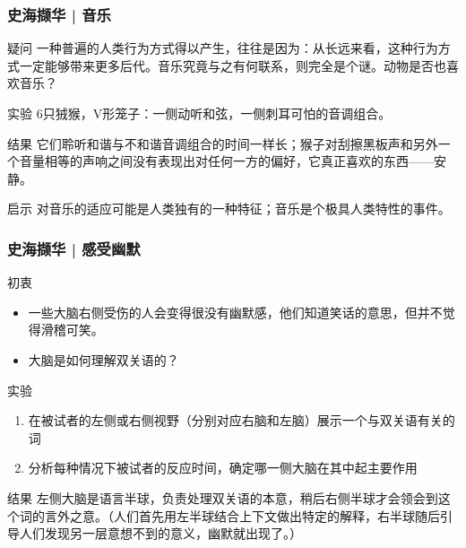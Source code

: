 \begin{frame}
  \frametitle{史海撷华 | 音乐}
  \begin{block}{疑问}
      一种普遍的人类行为方式得以产生，往往是因为：从长远来看，这种行为方式一定能够带来更多后代。音乐究竟与之有何联系，则完全是个谜。动物是否也喜欢音乐？
  \end{block}
  \vspace{-0.5em}
  \pause
  \begin{block}{实验}
    6只狨猴，V形笼子：一侧动听和弦，一侧刺耳可怕的音调组合。
  \end{block}
  \vspace{-0.5em}
  \pause
  \begin{block}{结果}
    它们聆听和谐与不和谐音调组合的时间一样长；猴子对刮擦黑板声和另外一个音量相等的声响之间没有表现出对任何一方的偏好，它真正喜欢的东西——安静。
  \end{block}
  \vspace{-0.5em}
  \pause
  \begin{block}{启示}
    对音乐的适应可能是人类独有的一种特征；音乐是个极具人类特性的事件。
  \end{block}
\end{frame}

\begin{frame}
  \frametitle{史海撷华 | 感受幽默}
  \begin{block}{初衷}
    \begin{itemize}
      \item 一些大脑右侧受伤的人会变得很没有幽默感，他们知道笑话的意思，但并不觉得滑稽可笑。
      \item 大脑是如何理解双关语的？
    \end{itemize}
  \end{block}
  \vspace{-0.5em}
  \pause
  \begin{block}{实验}
    \begin{enumerate}
      \item 在被试者的左侧或右侧视野（分别对应右脑和左脑）展示一个与双关语有关的词
      \item 分析每种情况下被试者的反应时间，确定哪一侧大脑在其中起主要作用
    \end{enumerate}
  \end{block}
  \vspace{-0.5em}
  \pause
  \begin{block}{结果}
    左侧大脑是语言半球，负责处理双关语的本意，稍后右侧半球才会领会到这个词的言外之意。（人们首先用左半球结合上下文做出特定的解释，右半球随后引导人们发现另一层意想不到的意义，幽默就出现了。）
  \end{block}
\end{frame}

